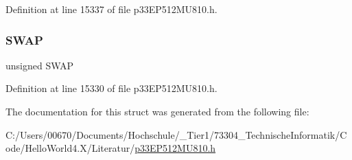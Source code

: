 Definition at line 15337 of file p33\+E\+P512\+M\+U810.\+h.

\mbox{\label{structtag_i_o_c_o_n6_b_i_t_s_a3ed0654ceb192d32e26d2929c9b8dcc2}} 
\subsubsection{\texorpdfstring{S\+W\+AP}{SWAP}}
{\footnotesize\ttfamily unsigned S\+W\+AP}



Definition at line 15330 of file p33\+E\+P512\+M\+U810.\+h.



The documentation for this struct was generated from the following file\+:\begin{DoxyCompactItemize}
\item 
C\+:/\+Users/00670/\+Documents/\+Hochschule/\+\_\+\+Tier1/73304\+\_\+\+Technische\+Informatik/\+Code/\+Hello\+World4.\+X/\+Literatur/\hyperlink{p33_e_p512_m_u810_8h}{p33\+E\+P512\+M\+U810.\+h}\end{DoxyCompactItemize}
